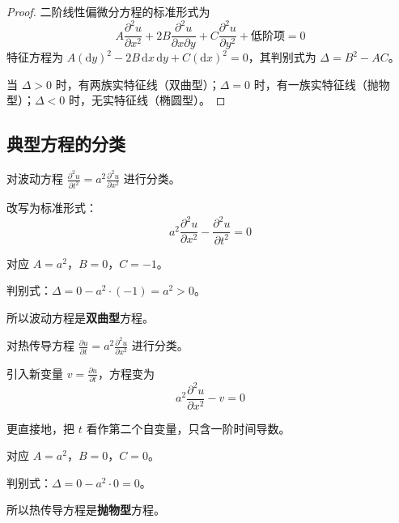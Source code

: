 \begin{proof}
二阶线性偏微分方程的标准形式为
\begin{equation}
    A\frac{\partial^2 u}{\partial x^2} + 2B\frac{\partial^2 u}{\partial x \partial y} + C\frac{\partial^2 u}{\partial y^2} + \text{低阶项} = 0
\end{equation}
特征方程为 $A(\mathrm{d}y)^2 - 2B\,\mathrm{d}x\,\mathrm{d}y + C(\mathrm{d}x)^2 = 0$，其判别式为 $\Delta = B^2 - AC$。

当 $\Delta > 0$ 时，有两族实特征线（双曲型）；$\Delta = 0$ 时，有一族实特征线（抛物型）；$\Delta < 0$ 时，无实特征线（椭圆型）。
\end{proof}

\subsection{典型方程的分类}

\begin{lizi}{}{}
对波动方程 $\frac{\partial^2 u}{\partial t^2} = a^2\frac{\partial^2 u}{\partial x^2}$ 进行分类。

\begin{jie}
    改写为标准形式：
    \begin{equation}
        a^2\frac{\partial^2 u}{\partial x^2} - \frac{\partial^2 u}{\partial t^2} = 0
    \end{equation}
    
    对应 $A = a^2$，$B = 0$，$C = -1$。
    
    判别式：$\Delta = 0 - a^2 \cdot (-1) = a^2 > 0$。
    
    所以波动方程是\textbf{双曲型}方程。
\end{jie}
\end{lizi}

\begin{lizi}{}{}
对热传导方程 $\frac{\partial u}{\partial t} = a^2\frac{\partial^2 u}{\partial x^2}$ 进行分类。

\begin{jie}
    引入新变量 $v = \frac{\partial u}{\partial t}$，方程变为
    \begin{equation}
        a^2\frac{\partial^2 u}{\partial x^2} - v = 0
    \end{equation}
    
    更直接地，把 $t$ 看作第二个自变量，只含一阶时间导数。
    
    对应 $A = a^2$，$B = 0$，$C = 0$。
    
    判别式：$\Delta = 0 - a^2 \cdot 0 = 0$。
    
    所以热传导方程是\textbf{抛物型}方程。
\end{jie}
\end{lizi}

